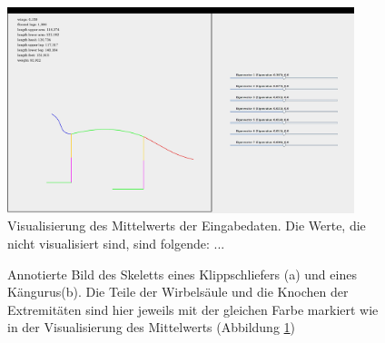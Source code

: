   \begin{figure}
  \centering
  \includegraphics[width=0.9\textwidth]{../PCA/mean_log_weight_downscaled_wings_legs_and_weight.jpg}
  \caption{Visualisierung des Mittelwerts der Eingabedaten. Die Werte, die nicht visualisiert sind, sind folgende: ...}
  \label{mean}
 \end{figure}
 
 \begin{figure}
  \qquad
  
  \caption{Annotierte Bild des Skeletts eines Klippschliefers (a) und eines Kängurus(b). Die Teile der Wirbelsäule und die Knochen der Extremitäten sind hier jeweils mit der gleichen Farbe markiert wie in der Visualisierung des Mittelwerts (Abbildung \ref{mean})}
 \end{figure}

